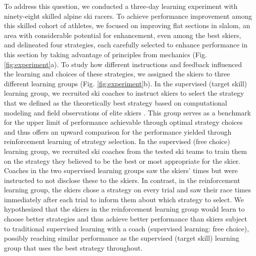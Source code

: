 \documentclass[pdflatex,sn-nature]{sn-jnl}%
\theoremstyle{thmstyleone}%
\theoremstyle{thmstyletwo}%
\theoremstyle{thmstylethree}%
\begin{document}
To address this question, we conducted a three-day learning experiment with ninety-eight skilled alpine ski racers. To achieve performance improvement among this skilled cohort of athletes, we focused on improving flat sections in slalom, an area with considerable potential for enhancement, even among the best skiers\cite{supej_new_2011}, and delineated four strategies, each carefully selected to enhance performance in this section by taking advantage of principles from mechanics (Fig. \ref{fig:experiment}a). To study how different instructions and feedback influenced the learning and choices of these strategies, we assigned the skiers to three different learning groups   (Fig. \ref{fig:experiment}b). In the supervised (target skill) learning group, we recruited ski coaches to instruct skiers to select the strategy that we defined as the theoretically best strategy based on computational modeling \cite{lind_physics_2004, mote_accelerations_1983, luginbuhl_identification_2023} and field observations of elite skiers \cite{reid_alpine_2020, magelssen_is_2022}. This group serves as a benchmark for the upper limit of performance achievable through optimal strategy choices and thus offers an upward comparison for the performance yielded through reinforcement learning of strategy selection. In the supervised (free choice) learning group, we recruited ski coaches from the tested ski teams to train them on the strategy they believed to be the best or most appropriate for the skier. Coaches in the two supervised learning groups saw the skiers' times but were instructed to not disclose these to the skiers. In contrast, in the reinforcement learning group, the skiers chose a strategy on every trial and saw their race times immediately after each trial to inform them about which strategy to select. We hypothesized that the skiers in the reinforcement learning group would learn to choose better strategies and thus achieve better performance than skiers subject to traditional supervised learning with a coach (supervised learning: free choice), possibly reaching similar performance as the supervised (target skill) learning group that uses the best strategy throughout. 
\end{document}
